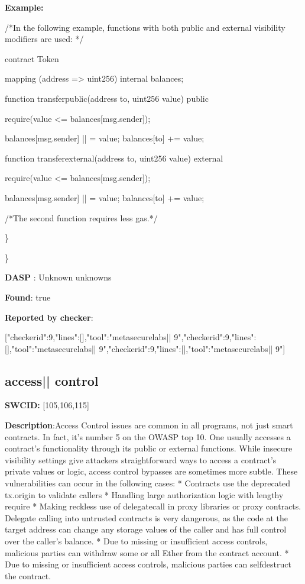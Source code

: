 \documentclass{article}
\begin{document}
\textbf{Example:} 
\begin{ffcode} 

 /*In the following example, functions with both public and external visibility modifiers are used: */ 

contract Token {

    mapping (address => uint256) internal \textunderscore balances;

    function transfer\textunderscore public(address to, uint256 value) public {
        require(value <= \textunderscore balances[msg.sender]);

        \textunderscore balances[msg.sender] |\textendash| = value;
        \textunderscore balances[to] += value;
    }

    function transfer\textunderscore external(address to, uint256 value) external {
        require(value <= \textunderscore balances[msg.sender]);

        \textunderscore balances[msg.sender] |\textendash| = value;
        \textunderscore balances[to] += value;
    }
}

 /*The second function requires less gas.*/ 

\end{ffcode} 
\} 

\} 

\textbf{DASP} : Unknown unknowns

\textbf{Found}: true

\textbf{Reported by checker}: 
\begin{ffcode} 

[{"checker\textunderscore id":9,"lines":[],"tool":"metasecurelabs|\textendash| 9"},{"checker\textunderscore id":9,"lines":[],"tool":"metasecurelabs|\textendash| 9"},{"checker\textunderscore id":9,"lines":[],"tool":"metasecurelabs|\textendash| 9"}]
\end{ffcode} 
\subsection{access{|\textunderscore| }control} 
\textbf{SWC{\textunderscore }ID:} [105,106,115]

\textbf{Description}:Access Control issues are common in all programs, not just smart contracts. In fact, it's number 5 on the OWASP top 10. One usually accesses a contract's functionality through its public or external functions. While insecure visibility settings give attackers straightforward ways to access a contract's private values or logic, access control bypasses are sometimes more subtle. These vulnerabilities can occur in the following cases:
* Contracts use the deprecated tx.origin to validate callers
* Handling large authorization logic with lengthy require
* Making reckless use of delegatecall in proxy libraries or proxy contracts. Delegate calling into untrusted contracts is very dangerous, as the code at the target address can change any storage values of the caller and has full control over the caller's balance.
* Due to missing or insufficient access controls, malicious parties can withdraw some or all Ether from the contract account.
* Due to missing or insufficient access controls, malicious parties can self{\textendash}destruct the contract.
\end{document}
